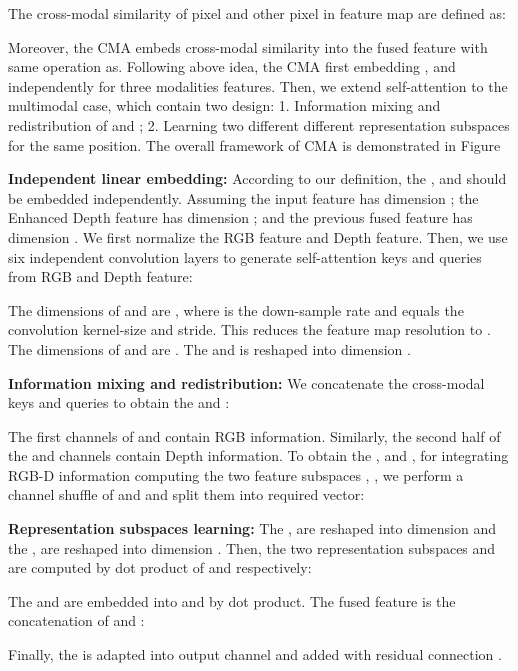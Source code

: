 \documentclass[letterpaper, 10 pt, conference]{ieeeconf}
\begin{document}
The cross-modal similarity of pixel  and other pixel in feature map are defined as:

Moreover, the CMA embeds cross-modal similarity into the fused feature  with same operation as\cite{vaswani2017attention,wang2018non,dosovitskiy2020image}. Following above idea, the CMA first embedding ,  and  independently for three modalities features. Then, we extend self-attention to the multimodal case, which contain two design: 1. Information mixing and redistribution of  and ; 2. Learning two different different representation subspaces for the same position. The overall framework of CMA is demonstrated in Figure 

\textbf{Independent linear embedding:} According to our definition, the ,  and  should be embedded independently. Assuming the input  feature has dimension ; the Enhanced Depth feature  has dimension ; and the previous fused feature  has dimension . We first normalize the RGB feature and Depth feature. Then, we use six independent convolution layers to generate self-attention keys and queries from RGB and Depth feature:
 
 
 
The dimensions of  and  are , where  is the down-sample rate and equals the convolution kernel-size and stride. This reduces the feature map resolution to . The dimensions of  and  are . The  and  is reshaped into dimension .

\textbf{Information mixing and redistribution:} We concatenate the cross-modal keys and queries to obtain the  and :
 
The first  channels of  and  contain RGB information. Similarly, the second half of the  and  channels contain Depth information. To obtain the ,  and ,  for integrating RGB-D information computing the two feature subspaces , , we perform a channel shuffle of  and  and split them into required vector:
 




\textbf{Representation subspaces learning:} The ,  are reshaped into dimension  and the ,  are reshaped into dimension . Then, the two representation subspaces  and  are computed by dot product of  and  respectively:
 
The  and  are embedded into  and  by dot product. The fused feature  is the concatenation of  and : 

Finally, the  is adapted into output channel  and added with residual connection .
\end{document}
